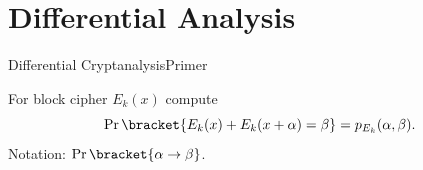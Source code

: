 \section{Differential Analysis}
\begin{frame}{Differential Cryptanalysis}{Primer}
    \begin{minipage}{0.47\textwidth}
        \centering
        For block cipher $E_k(x)$ compute
        \begin{equation*}
            \Prob\bracket{E_k(x) + E_k(x + \alpha) = \beta} = p_{E_k}(\alpha, \beta).
        \end{equation*}
        Notation: $\Prob\bracket{\alpha \to \beta}$.


    \end{minipage}
    \begin{minipage}{0.47\textwidth}
        \centering
    \end{minipage}
\end{frame}

